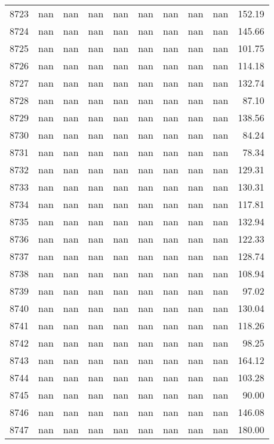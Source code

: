 \begin{tabular}{lrrrrrrrrr}
8723 & nan & nan & nan & nan & nan & nan & nan & nan & 152.19 \\
8724 & nan & nan & nan & nan & nan & nan & nan & nan & 145.66 \\
8725 & nan & nan & nan & nan & nan & nan & nan & nan & 101.75 \\
8726 & nan & nan & nan & nan & nan & nan & nan & nan & 114.18 \\
8727 & nan & nan & nan & nan & nan & nan & nan & nan & 132.74 \\
8728 & nan & nan & nan & nan & nan & nan & nan & nan & 87.10 \\
8729 & nan & nan & nan & nan & nan & nan & nan & nan & 138.56 \\
8730 & nan & nan & nan & nan & nan & nan & nan & nan & 84.24 \\
8731 & nan & nan & nan & nan & nan & nan & nan & nan & 78.34 \\
8732 & nan & nan & nan & nan & nan & nan & nan & nan & 129.31 \\
8733 & nan & nan & nan & nan & nan & nan & nan & nan & 130.31 \\
8734 & nan & nan & nan & nan & nan & nan & nan & nan & 117.81 \\
8735 & nan & nan & nan & nan & nan & nan & nan & nan & 132.94 \\
8736 & nan & nan & nan & nan & nan & nan & nan & nan & 122.33 \\
8737 & nan & nan & nan & nan & nan & nan & nan & nan & 128.74 \\
8738 & nan & nan & nan & nan & nan & nan & nan & nan & 108.94 \\
8739 & nan & nan & nan & nan & nan & nan & nan & nan & 97.02 \\
8740 & nan & nan & nan & nan & nan & nan & nan & nan & 130.04 \\
8741 & nan & nan & nan & nan & nan & nan & nan & nan & 118.26 \\
8742 & nan & nan & nan & nan & nan & nan & nan & nan & 98.25 \\
8743 & nan & nan & nan & nan & nan & nan & nan & nan & 164.12 \\
8744 & nan & nan & nan & nan & nan & nan & nan & nan & 103.28 \\
8745 & nan & nan & nan & nan & nan & nan & nan & nan & 90.00 \\
8746 & nan & nan & nan & nan & nan & nan & nan & nan & 146.08 \\
8747 & nan & nan & nan & nan & nan & nan & nan & nan & 180.00 \\

\end{tabular}
